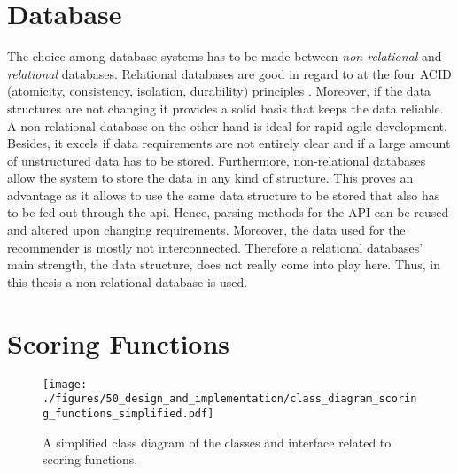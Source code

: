 \section{Database}
\label{sec:DesignImplementation:Database}

The choice among database systems has to be made between \emph{non-relational} and \emph{relational} databases. Relational databases are good in regard to at the four ACID (atomicity, consistency, isolation, durability) principles \cite{chrysanthis1998recovery, cookACIDBASEDatabase2009}. Moreover, if the data structures are not changing it provides a solid basis that keeps the data reliable. A non-relational database on the other hand is ideal for rapid agile development. Besides, it excels if data requirements are not entirely clear and if a large amount of unstructured  data has to be stored. Furthermore, non-relational databases allow the system to store the data in any kind of structure. This proves an advantage as it allows to use the same data structure to be stored that also has to be fed out through the api. Hence, parsing methods for the API can be reused and altered upon changing requirements. Moreover, the data used for the recommender is mostly not interconnected. Therefore a relational databases' main strength, the data structure, does not really come into play here. Thus, in this thesis a non-relational database is used. 

\section{Scoring Functions}
\label{sec:DesignImplementation:ScroingFunctions}

\begin{figure}[tb]
    \centering
    \texttt{[image: ./figures/50\_design\_and\_implementation/class\_diagram\_scoring\_functions\_simplified.pdf]}
    \caption[Class Diagram: Scoring Functions]{A simplified class diagram of the classes and interface related to scoring functions. }
    \label{fig:DesignImplementation:ClassDiagramScoringFunctions}
\end{figure}

